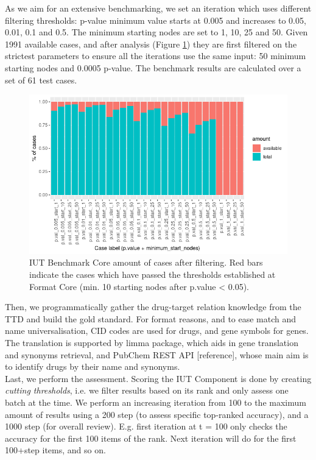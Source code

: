As we aim for an extensive benchmarking, we set an iteration which uses different filtering thresholds: p-value minimum value starts at 0.005 and increases to 0.05, 0.01, 0.1 and 0.5. The minimum starting nodes are set to 1, 10, 25 and 50. Given 1991 available cases, and after analysis (Figure \ref{img:benchprogramma_histogram}) they are first filtered on the strictest parameters to ensure all the iterations use the same input: 50 minimum starting nodes and 0.0005 p-value. The benchmark results are calculated over a set of 61 test cases.
\\

\begin{figure}
    \centering
    \includegraphics[width=\linewidth]{Major Thesis/figures/iut/bench/benchmark-bars.png}
    \caption{IUT Benchmark Core amount of cases after filtering. Red bars indicate the cases which have passed the thresholds established at Format Core (min. 10 starting nodes after p.value < 0.05).}
    \label{img:benchprogramma_histogram}
\end{figure}

Then, we programmatically gather the drug-target relation knowledge from the TTD and build the gold standard. For format reasons, and to ease match and name universalisation, CID codes are used for drugs, and gene symbols for genes. The translation is supported by limma package, which aids in gene translation and synonyms retrieval, and PubChem REST API [reference], whose main aim is to identify drugs by their name and synonyms.
\\

Last, we perform the assessment. Scoring the IUT Component is done by creating \textit{cutting thresholds}, i.e. we filter results based on its rank and only assess one batch at the time. We perform an increasing iteration from 100 to the maximum amount of results using a 200 step (to assess specific top-ranked accuracy), and a 1000 step (for overall review). E.g. first iteration at t = 100 only checks the accuracy for the first 100 items of the rank. Next iteration will do for the first 100+step items, and so on.
\\

